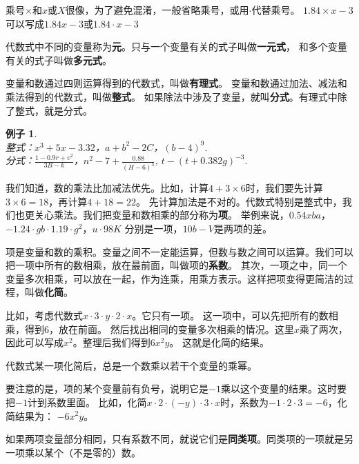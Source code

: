 \documentclass[12pt,UTF8]{ctexbook}
\newtheorem{ex}{例子}[section]
\begin{document}
乘号$\times$和$x$或$X$很像，为了避免混淆，一般省略乘号，或用$\cdot$代替乘号。
$1.84\times x - 3$可以写成$1.84 x - 3$或$1.84\cdot x - 3$

代数式中不同的变量称为\textbf{元}。只与一个变量有关的式子叫做\textbf{一元式}，
和多个变量有关的式子叫做\textbf{多元式}。

变量和数通过四则运算得到的代数式，叫做\textbf{有理式}。
变量和数通过加法、减法和乘法得到的代数式，叫做\textbf{整式}。
如果除法中涉及了变量，就叫\textbf{分式}。有理式中除了整式，就是分式。
\begin{ex}\label{ex:1-1-0}
    \mbox{} \\
    \indent 整式：$x^3 + 5x - 3.32$，$a + b^2 - 2C$，$(b - 4)^9.$ \\
    \indent 分式：$\frac{1 - 0.9r + v^2}{3B - k}$，$n^2 - 7 + \frac{0.88}{(H - 6)^3}$, $t - (t + 0.382g)^{-3}.$\\
\end{ex}

我们知道，数的乘法比加减法优先。比如，计算$4 + 3\times 6$时，我们要先计算$3\times 6 = 18$，再计算$4 + 18 = 22$。
先计算加法是不对的。代数式特别是整式中，我们也更关心乘法。我们把变量和数相乘的部分称为\textbf{项}。
举例来说，$0.54xba$，$-1.24\cdot gb\cdot 1.19 \cdot g^2$，$u\cdot 98K$
分别是一项，$10b - V$是两项的差。

项是变量和数的乘积。变量之间不一定能运算，但数与数之间可以运算。我们可以把一项中所有的数相乘，放在最前面，叫做项的\textbf{系数}。
其次，一项之中，同一个变量多次相乘，可以放在一起，作为连乘，用乘方表示。这样把项变得更简洁的过程，叫做\textbf{化简}。

比如，考虑代数式$x\cdot 3\cdot y \cdot 2\cdot x $。它只有一项。
这一项中，可以先把所有的数相乘，得到$6$，放在前面。
然后找出相同的变量多次相乘的情况。这里$x$乘了两次，因此可以写成$x^2$。整理后我们得到$6x^2y$。
这就是化简的结果。

代数式某一项化简后，总是一个数乘以若干个变量的乘幂。

要注意的是，项的某个变量前有负号，说明它是$-1$乘以这个变量的结果。这时要把$-1$计到系数里面。
比如，化简$x\cdot 2 \cdot (-y)\cdot 3\cdot x$时，系数为$-1\cdot 2\cdot 3=-6$，化简结果为：
$-6x^2y$。

如果两项变量部分相同，只有系数不同，就说它们是\textbf{同类项}。同类项的一项就是另一项乘以某个（不是零的）数。
\end{document}
